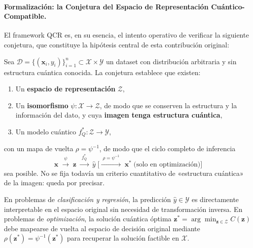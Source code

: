 \paragraph{Formalización: la Conjetura del Espacio de Representación Cuántico-Compatible.}
\label{par:conjetura_qcr}

El framework QCR es, en su esencia, el intento operativo de verificar la siguiente conjetura, que constituye la hipótesis central de esta contribución original:

\begin{conjetura}
\label{conj:qcr}
Sea $\mathcal{D} = \{(\mathbf{x}_i, y_i)\}_{i=1}^n \subset \mathcal{X} \times \mathcal{Y}$ un dataset con distribución arbitraria y sin estructura cuántica conocida. La conjetura establece que existen:
\begin{enumerate}
  \item Un \textbf{espacio de representación} $\mathcal{Z}$,
  \item Un \textbf{isomorfismo} $\psi: \mathcal{X} \rightarrow \mathcal{Z}$, de modo que se conserven la estructura y la información del dato, y cuya \textbf{imagen tenga estructura cuántica},
  \item Un modelo cuántico $f_Q^*: \mathcal{Z} \rightarrow \mathcal{Y}$,
\end{enumerate}
con un mapa de vuelta $\rho = \psi^{-1}$, de modo que el ciclo completo de inferencia
\begin{equation}
  \mathbf{x}
  \;\xrightarrow{\;\psi\;}\;
  \mathbf{z}
  \;\xrightarrow{\;f_Q^*\;}\;
  \hat{y}
  \;\Big[\xrightarrow{\;\rho=\psi^{-1}\;}\; \mathbf{x}^* \;\text{(solo en optimización)}\Big]
  \label{eq:ciclo_qcr}
\end{equation}
sea posible. No se fija todavía un criterio cuantitativo de «estructura cuántica» de la imagen: queda por precisar.

En problemas de \emph{clasificación y regresión}, la predicción $\hat{y} \in \mathcal{Y}$ es directamente interpretable en el espacio original sin necesidad de transformación inversa. En problemas de \emph{optimización}, la solución cuántica óptima $\mathbf{z}^* = \arg\min_{\mathbf{z} \in \mathcal{Z}} C(\mathbf{z})$ debe mapearse de vuelta al espacio de decisión original mediante $\rho(\mathbf{z}^*)=\psi^{-1}(\mathbf{z}^*)$ para recuperar la solución factible en $\mathcal{X}$.
\end{conjetura}

